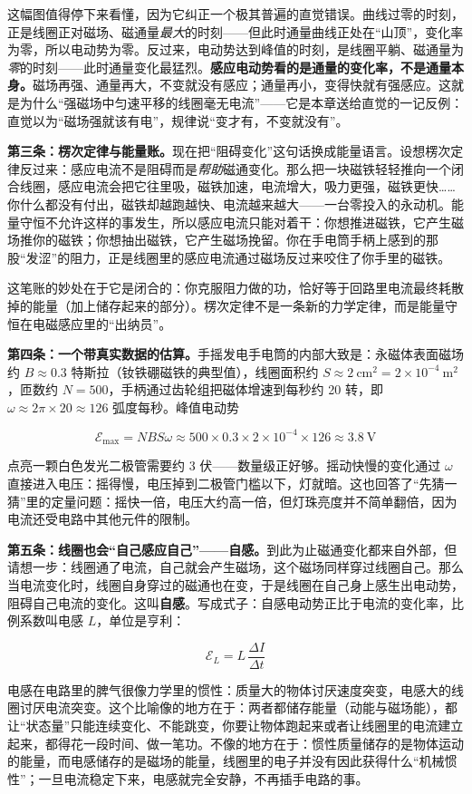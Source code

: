 这幅图值得停下来看懂，因为它纠正一个极其普遍的直觉错误。曲线过零的时刻，正是线圈正对磁场、磁通量\emph{最大}的时刻——但此时通量曲线正处在“山顶”，变化率为零，所以电动势为零。反过来，电动势达到峰值的时刻，是线圈平躺、磁通量为\emph{零}的时刻——此时通量变化最猛烈。\textbf{感应电动势看的是通量的变化率，不是通量本身。}磁场再强、通量再大，不变就没有感应；通量再小，变得快就有强感应。这就是为什么“强磁场中匀速平移的线圈毫无电流”——它是本章送给直觉的一记反例：直觉以为“磁场强就该有电”，规律说“变才有，不变就没有”。

\textbf{第三条：楞次定律与能量账。}现在把“阻碍变化”这句话换成能量语言。设想楞次定律反过来：感应电流不是阻碍而是\emph{帮助}磁通变化。那么把一块磁铁轻轻推向一个闭合线圈，感应电流会把它往里吸，磁铁加速，电流增大，吸力更强，磁铁更快……你什么都没有付出，磁铁却越跑越快、电流越来越大——一台零投入的永动机。能量守恒不允许这样的事发生，所以感应电流只能对着干：你想推进磁铁，它产生磁场推你的磁铁；你想抽出磁铁，它产生磁场挽留。你在手电筒手柄上感到的那股“发涩”的阻力，正是线圈里的感应电流通过磁场反过来咬住了你手里的磁铁。

这笔账的妙处在于它是闭合的：你克服阻力做的功，恰好等于回路里电流最终耗散掉的能量（加上储存起来的部分）。楞次定律不是一条新的力学定律，而是能量守恒在电磁感应里的“出纳员”。

\textbf{第四条：一个带真实数据的估算。}手摇发电手电筒的内部大致是：永磁体表面磁场约 \(B\approx 0.3\) 特斯拉（钕铁硼磁铁的典型值），线圈面积约 \(S\approx 2\ \mathrm{cm^2}=2\times10^{-4}\ \mathrm{m^2}\)，匝数约 \(N=500\)，手柄通过齿轮组把磁体增速到每秒约 20 转，即 \(\omega\approx 2\pi\times20\approx 126\) 弧度每秒。峰值电动势

\[
\mathcal{E}_{\max}=NBS\omega \approx 500\times0.3\times2\times10^{-4}\times126\approx 3.8\ \mathrm{V}
\]

点亮一颗白色发光二极管需要约 3 伏——数量级正好够。摇动快慢的变化通过 \(\omega\) 直接进入电压：摇得慢，电压掉到二极管门槛以下，灯就暗。这也回答了“先猜一猜”里的定量问题：摇快一倍，电压大约高一倍，但灯珠亮度并不简单翻倍，因为电流还受电路中其他元件的限制。

\textbf{第五条：线圈也会“自己感应自己”——自感。}到此为止磁通变化都来自外部，但请想一步：线圈通了电流，自己就会产生磁场，这个磁场同样穿过线圈自己。那么当电流变化时，线圈自身穿过的磁通也在变，于是线圈在自己身上感生出电动势，阻碍自己电流的变化。这叫\textbf{自感}。写成式子：自感电动势正比于电流的变化率，比例系数叫电感 \(L\)，单位是亨利：

\[
\mathcal{E}_{L} = L\,\frac{\Delta I}{\Delta t}
\]

电感在电路里的脾气很像力学里的惯性：质量大的物体讨厌速度突变，电感大的线圈讨厌电流突变。这个比喻像的地方在于：两者都储存能量（动能与磁场能），都让“状态量”只能连续变化、不能跳变，你要让物体跑起来或者让线圈里的电流建立起来，都得花一段时间、做一笔功。不像的地方在于：惯性质量储存的是物体运动的能量，而电感储存的是磁场的能量，线圈里的电子并没有因此获得什么“机械惯性”；一旦电流稳定下来，电感就完全安静，不再插手电路的事。

